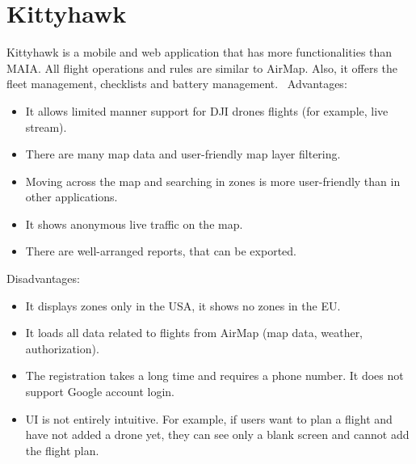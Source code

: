 \section{Kittyhawk}\label{sec:kittyhawk}
Kittyhawk is a mobile and web application that has more functionalities than MAIA.
All flight operations and rules are similar to AirMap.
Also, it offers the fleet management, checklists and battery management.~\cite{kittyhawk}
\newline
\newline
Advantages:
\begin{itemize}
    \item It allows limited manner support for DJI drones flights (for example, live stream).
    \item There are many map data and user-friendly map layer filtering.
    \item Moving across the map and searching in zones is more user-friendly than in other applications.
    \item It shows anonymous live traffic on the map.
    \item There are well-arranged reports, that can be exported.
\end{itemize}
Disadvantages:
\begin{itemize}
    \item It displays zones only in the USA, it shows no zones in the EU.
    \item It loads all data related to flights from AirMap (map data, weather, authorization).
    \item The registration takes a long time and requires a phone number.
    It does not support Google account login.
    \item UI is not entirely intuitive.
    For example, if users want to plan a flight and have not added a drone yet, they can see only a blank screen and cannot add the flight plan.
\end{itemize}
